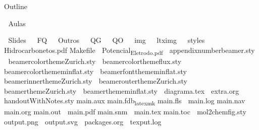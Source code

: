 \documentclass[presentation]{beamer}
\author{fabio}
\date{\today}
\title{}
\begin{document}
\begin{frame}{Outline}
\tableofcontents
\end{frame}

	Aulas

	Slides
  		FQ
  		Outros
  		QG
  		QO
  		img
  		ltximg
  		styles
   		Hidrocarbonetos.pdf
   Makefile
   		Potencial\textsubscript{Eletrodo.pdf}
   		appendixnumberbeamer.sty
   		beamercolorthemeZurich.sty
   		beamercolorthemeflux.sty
   		beamercolorthememinflat.sty
   		beamerfontthememinflat.sty
   		beamerinnerthemeZurich.sty
   		beamerouterthemeZurich.sty
   		beamerthemeZurich.sty
   		beamerthememinflat.sty
   		diagrama.tex
   		extra.org
   		handoutWithNotes.sty
   main.aux
   main.fdb\textsubscript{latexmk}
   main.fls
   		main.log
   main.nav
   		main.org
   main.out
   		main.pdf
   main.snm
   		main.tex
   main.toc
   		mol2chemfig.sty
   	󰸭	output.png
   		output.svg
   		packages.org
   		texput.log
\end{document}
